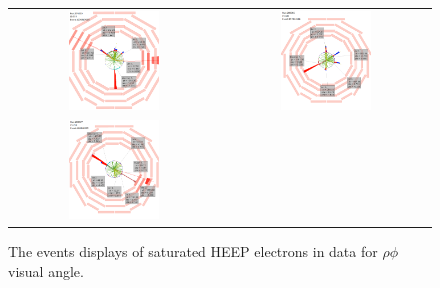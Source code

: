 \begin{figure}[bh]
  \begin{center}
    \begin{tabular}{cc}
      \includegraphics[width=0.45\textwidth]{chapters/Zprime/Saturation/images/FlatPt/cmsShow/274250_1076867675_553_RhoPhi.png} &
      \includegraphics[width=0.45\textwidth]{chapters/Zprime/Saturation/images/FlatPt/cmsShow/280015_897834686_481_RhoPhi.png} \\
      \includegraphics[width=0.45\textwidth]{chapters/Zprime/Saturation/images/FlatPt/cmsShow/283877_400840829_219_RhoPhi.png}
    \end{tabular}
    \caption{ The events displays of saturated HEEP electrons in data for $\rho\phi$ visual angle.}
    \label{fig:event_display}
  \end{center}
\end{figure}


